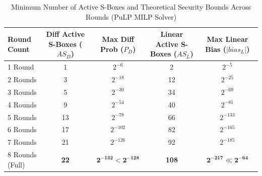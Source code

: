 \begin{table}[htbp]
\caption{Minimum Number of Active S-Boxes and Theoretical Security Bounds Across Rounds (PuLP MILP Solver)}
\label{tab:milp_active_sboxes}
\centering
\small
\begin{tabular}{@{}lcccc@{}}
\toprule
\textbf{Round Count} & \textbf{Diff Active S-Boxes ($AS_D$)} & \textbf{Max Diff Prob ($P_D$)} & \textbf{Linear Active S-Boxes ($AS_L$)} & \textbf{Max Linear Bias ($|bias_L|$)} \\ \midrule
1 Round & 1 & $2^{-6}$ & 2 & $2^{-5}$ \\
2 Rounds & 3 & $2^{-18}$ & 12 & $2^{-25}$ \\
3 Rounds & 5 & $2^{-30}$ & 34 & $2^{-69}$ \\
4 Rounds & 9 & $2^{-54}$ & 40 & $2^{-81}$ \\
5 Rounds & 13 & $2^{-78}$ & 66 & $2^{-133}$ \\
6 Rounds & 17 & $2^{-102}$ & 82 & $2^{-165}$ \\
7 Rounds & 21 & $2^{-126}$ & 92 & $2^{-185}$ \\
8 Rounds (Full) & \textbf{22} & $\mathbf{2^{-132} < 2^{-128}}$ & \textbf{108} & $\mathbf{2^{-217} \ll 2^{-64}}$ \\ \bottomrule
\end{tabular}
\end{table}
